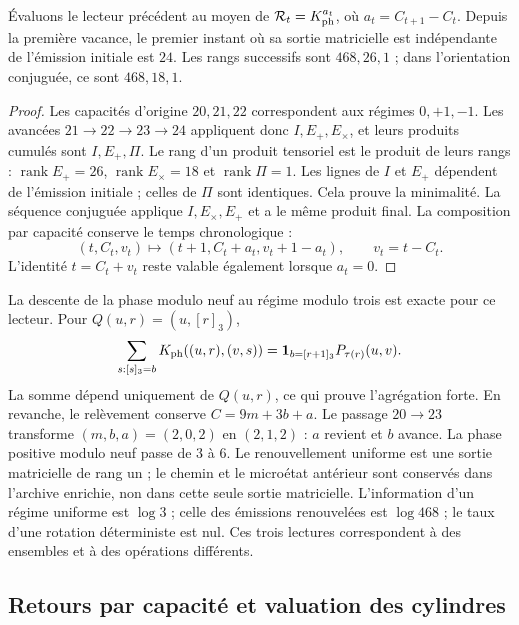 \begin{proposition}
\label{prop:ii-ter27-renovacion}
Évaluons le lecteur précédent au moyen de $\mathcal R_t=K_{\rm ph}^{a_t}$,
où $a_t=C_{t+1}-C_t$. Depuis la première vacance, le premier instant où
sa sortie matricielle est indépendante de l’émission initiale est $24$.
Les rangs successifs sont $468,26,1$ ; dans l’orientation conjuguée, ce sont
$468,18,1$.
\end{proposition}
\begin{proof}
Les capacités d’origine $20,21,22$ correspondent aux régimes
$0,+1,-1$. Les avancées $21\to22\to23\to24$ appliquent donc
$I,E_+,E_\times$, et leurs produits cumulés sont $I,E_+,\Pi$.
Le rang d’un produit tensoriel est le produit de leurs rangs :
$\operatorname{rank}E_+=26$, $\operatorname{rank}E_\times=18$ et
$\operatorname{rank}\Pi=1$. Les lignes de $I$ et $E_+$ dépendent de
l’émission initiale ; celles de $\Pi$ sont identiques. Cela prouve la minimalité.
La séquence conjuguée applique $I,E_\times,E_+$ et a le même produit
final. La composition par capacité conserve le temps chronologique :
\[
 (t,C_t,v_t)\mapsto(t+1,C_t+a_t,v_t+1-a_t),\qquad v_t=t-C_t.
\]
L’identité $t=C_t+v_t$ reste valable également lorsque $a_t=0$.
\end{proof}

La descente de la phase modulo neuf au régime modulo trois est exacte
pour ce lecteur. Pour $Q(u,r)=(u,[r]_3)$,
\[
 \sum_{s:[s]_3=b}K_{\rm ph}((u,r),(v,s))
 =\mathbf1_{b=[r+1]_3}P_{\tau(r)}(u,v).
\]
La somme dépend uniquement de $Q(u,r)$, ce qui prouve l’agrégation forte.
En revanche, le relèvement conserve $C=9m+3b+a$. Le passage $20\to23$
transforme $(m,b,a)=(2,0,2)$ en $(2,1,2)$ : $a$ revient et $b$ avance.
La phase positive modulo neuf passe de $3$ à $6$. Le renouvellement uniforme
est une sortie matricielle de rang un ; le chemin et le microétat antérieur sont
conservés dans l’archive enrichie, non dans cette seule sortie matricielle.
L’information d’un régime uniforme est $\log3$ ; celle des émissions
renouvelées est $\log468$ ; le taux d’une rotation déterministe est nul.
Ces trois lectures correspondent à des ensembles et à des opérations différents.

\subsection{Retours par capacité et valuation des cylindres}
\label{sec:ii-ter27-cociclo}


